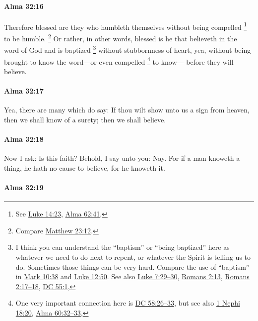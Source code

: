 		\paragraph{Alma 32:16} %
			\label{ALMA-32-16}
			
			Therefore blessed are they who humbleth themselves
			without being compelled%
				\footnote{%
					See \hyperref[LUKE-14-23]{Luke 14:23}, \hyperref[ALMA-62-41]{Alma 62:41},
				}
			to be humble.%
				\footnote{%
					Compare \hyperref[MATTHEW-23-12]{Matthew 23:12}.
					}
			Or rather, in other words, blessed is he
			that believeth in the word of God and is baptized%
				\footnote{%
					\label{ALMA-32-16-baptized}%
					I think you can understand the ``baptism'' or ``being baptized'' here as whatever we need to do next to repent, or whatever the Spirit is telling us to do. Sometimes those things can be very hard. Compare the use of ``baptism'' in \hyperref[MARK-10-38]{Mark 10:38} and \hyperref[LUKE-12-50]{Luke 12:50}. See also \hyperref[LUKE-7-29]{Luke 7:29--30}, \hyperref[ROMANS-2-13]{Romans 2:13}, \hyperref[ROMANS-2-17]{Romans 2:17--18}, \hyperref[DC55-1]{DC 55:1}, 
					}
			without stubbornness of heart,
			yea, without being brought to know the word---or even compelled%
				\footnote{%
					One very important connection here is \hyperref[DC58-26]{DC 58:26--33}, but see also \hyperref[1NEPHI-18-20]{1 Nephi 18:20}, \hyperref[ALMA-60-32]{Alma 60:32--33},
					}
			to know---
			before they will believe.

		\paragraph{Alma 32:17} %
			\label{ALMA-32-17}

			Yea, there are many which do say:
			If thou wilt show unto us a sign from heaven,
			then we shall know of a surety;
			then we shall believe.

		\paragraph{Alma 32:18} %
			\label{ALMA-32-18}

			Now I ask:
			Is this faith?
			Behold, I say unto you: Nay.
			For if a man knoweth a thing, he hath no cause to believe,
			for he knoweth it.

		\paragraph{Alma 32:19} %
			\label{ALMA-32-19}

